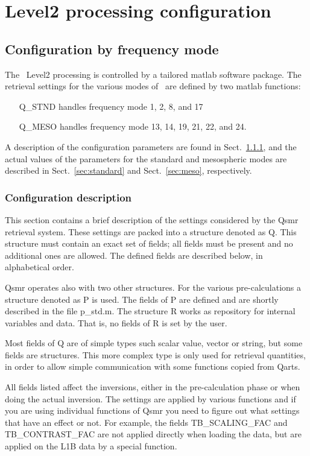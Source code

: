 \chapter{Level2 processing configuration}

\section{Configuration by frequency mode}
The \smr\ Level2 processing is controlled by a tailored matlab software
package. The retrieval settings for the various modes of \smr\
are defined by two matlab functions:
 
\begin{itemize}
\item[{Q\_STND}]
  handles frequency mode 1, 2, 8, and 17
\item[{Q\_MESO}]
  handles frequency mode 13, 14, 19, 21, 22, and 24.
\end{itemize}

A description of the configuration parameters are found
in Sect.~\ref{sec:config}, and the actual values
of the parameters for the standard and mesospheric modes
are described in Sect.~\ref{sec:standard} and Sect.~\ref{sec:meso},
respectively.

\subsection{Configuration description}
\label{sec:config}

This section contains a brief description of the settings considered by the
Qsmr retrieval system. These settings are packed into a structure denoted
as Q. This structure must contain an exact set of fields; all fields must be
present and no additional ones are allowed. The defined fields are described
below, in alphabetical order.

Qsmr operates also with two other structures. For the various
pre-calculations a structure denoted as P is used. The fields of P are
defined and are shortly described in the file p\_std.m. The structure R works
as repository for internal variables and data. That is, no fields of R is
set by the user.

Most fields of Q are of simple types such scalar value, vector or string,
but some fields are structures. This more complex type is only used for
retrieval quantities, in order to allow simple communication with some
functions copied from Qarts.

All fields listed affect the inversions, either in the pre-calculation phase
or when doing the actual inversion. The settings are applied by various
functions and if you are using individual functions of Qsmr you need to
figure out what settings that have an effect or not. For example, the fields
TB\_SCALING\_FAC and TB\_CONTRAST\_FAC are not applied directly when loading the
data, but are applied on the L1B data by a special function.


